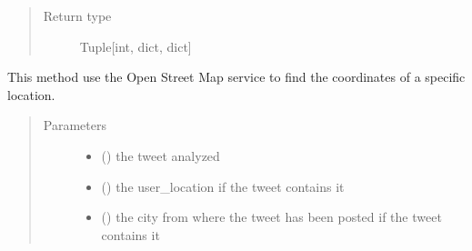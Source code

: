 \documentclass[letterpaper,10pt,english]{sphinxmanual}
\begin{document}
\begin{fulllineitems}
\begin{fulllineitems}
\begin{quote}
\begin{description}
\item[{Return type}] \leavevmode
\sphinxAtStartPar
Tuple{[}int, dict, dict{]}

\end{description}\end{quote}

\end{fulllineitems}


\begin{fulllineitems}
\label{\detokenize{code_comment/tweet_processor:hate_tweet_map.tweets_processor.TweetProcessor.ProcessTweet.__get_osm_coordinates}}
\sphinxAtStartPar
This method use the Open Street Map service to find the coordinates of a specific location.
\begin{quote}\begin{description}
\item[{Parameters}] \leavevmode\begin{itemize}
\item {} 
\sphinxAtStartPar
{} () \textendash{} the tweet analyzed

\item {} 
\sphinxAtStartPar
{} (\sphinxstyleliteralemphasis{\sphinxupquote{, }}) \textendash{} the user\_location if the tweet contains it

\item {} 
\sphinxAtStartPar
{} (\sphinxstyleliteralemphasis{\sphinxupquote{, }}) \textendash{} the city from where the tweet has been posted if the tweet contains it


\end{itemize}
\end{description}
\end{quote}
\end{fulllineitems}
\end{fulllineitems}
\end{document}
